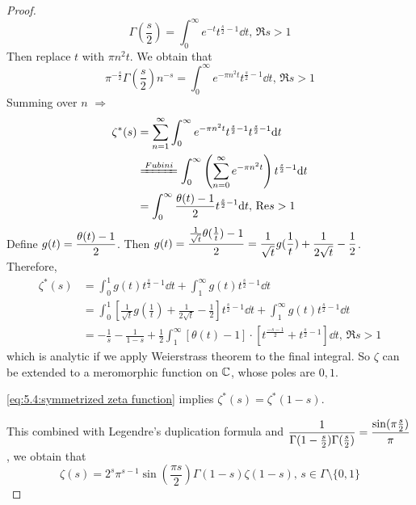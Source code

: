 \begin{proof}
    \begin{equation}
        \Gamma(\frac{s}{2})=\int_0^\infty e^{-t}t^{\frac{s}{2}-1}\dd t,\,\Re s>1
    \end{equation}
    Then replace  $ t  $ with  $ \pi n^2 t $. We obtain that  
    \begin{equation}
        \pi^{-\frac{s}{2}}\Gamma(\frac{s}{2})n^{-s}=\int_0^\infty e^{-\pi n^2t}t^{\frac{s}{2}-1}\dd t,\,\Re s>1
    \end{equation}
    Summing over  $ n $ $ \Rightarrow  $   
    \begin{equation}
        \begin{aligned}
            \zeta^*(s)&=\dps\sum_{n=1}^\infty \int_0^\infty e^{-\pi n^2t}t^{\frac{s}{2}-1}t^{\frac{s}{2}-1}\dd t\\
            & \xlongequal{Fubini} \int_0^\infty \left(\sum_{n=0}^\infty e^{-\pi n^2t}\right)t^{\frac{s}{2}-1}\dd t\\
            &=\int_0^\infty\frac{\theta(t)-1}{2}t^{\frac{s}{2}-1}\dd t,\,\Re s>1
        \end{aligned}
    \end{equation}
    Define  $\displaystyle g(t)=\frac{\theta(t)-1}{2} $. Then  $ g(t)=\displaystyle\frac{\frac{1}{\sqrt{t}}\theta(\frac{1}{t})-1}{2}=\frac{1}{\sqrt{t}}g(\frac{1}{t})+\frac{1}{2\sqrt{t}}-\frac{1}{2} $. Therefore, 
    \begin{equation}
        \begin{aligned}
            \zeta^*(s)&=\int_0^1g(t)t^{\frac{s}{2}-1}\dd t+\int_1^\infty g(t)t^{\frac{s}{2}-1}\dd t\\ 
            &=\int_0^1[\frac{1}{\sqrt{t}}g(\frac{1}{t})+\frac{1}{2\sqrt{t}}-\frac{1}{2}]t^{\frac{s}{2}-1}\dd t+\int_1^\infty g(t)t^{\frac{s}{2}-1}\dd t\\ 
            &=-\frac{1}{s}-\frac{1}{1-s}+\frac{1}{2}\int_1^\infty[\theta(t)-1]\cdot[t^{\frac{-s-1}{2}}+t^{\frac{s}{2}-1}]\dd t,\,\Re s>1
        \end{aligned}
    \end{equation}
    which is analytic if we apply Weierstrass theorem to the final integral. So  $ \zeta  $ can be extended to a meromorphic function on  $ \mathbb C $, whose poles are  $ 0,1 $.
    
    \eqref{eq:5.4:symmetrized zeta function} implies  $ \zeta^*(s)=\zeta^*(1-s) $.
    
    This combined with Legendre's duplication formula and  $ \displaystyle\frac{1}{\Gamma(1-\frac{s}{2})\Gamma(\frac{s}{2})}=\frac{\sin (\pi \frac{s}{2})}{\pi} $, we obtain that 
    \begin{equation}\label{eq:5.4:symmetry of zeta function}
        \zeta(s)=2^s\pi^{s-1}\sin(\frac{\pi s}{2})\Gamma(1-s)\zeta(1-s),\, s\in \Gamma\setminus\{0,1\}
    \end{equation} 


\end{proof}
